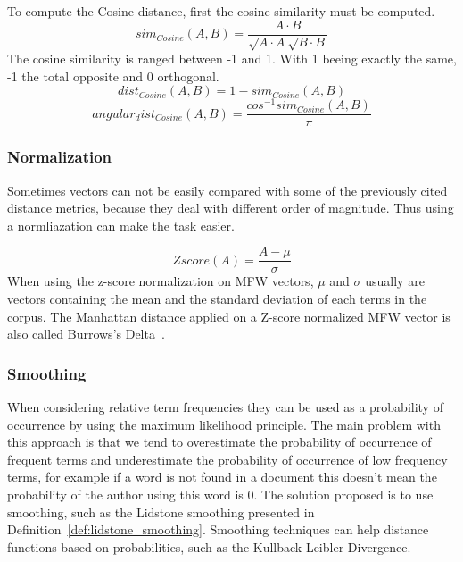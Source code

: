 \begin{definition}
  \label{def:cosine_dist}
  To compute the Cosine distance, first the cosine similarity must be computed.
  \begin{equation}
    sim_{Cosine}(A, B) = \frac{A \cdot B}{\sqrt{A \cdot A}\sqrt{B \cdot B}}
  \end{equation}
  The cosine similarity is ranged between -1 and 1.
  With 1 beeing exactly the same, -1 the total opposite and 0 orthogonal.
  \begin{equation}
    dist_{Cosine}(A, B) = 1 - sim_{Cosine}(A, B)
  \end{equation}
  \begin{equation}
    angular_dist_{Cosine}(A, B) = \frac{cos^{-1}sim_{Cosine}(A, B)}{\pi}
  \end{equation}
\end{definition}

\subsubsection{Normalization}

Sometimes vectors can not be easily compared with some of the previously cited distance metrics, because they deal with different order of magnitude.
Thus using a normliazation can make the task easier.

\begin{definition}
  \begin{equation}
    Zscore(A) = \frac{A - \mu}{\sigma}
  \end{equation}
  When using the z-score normalization on MFW vectors, $\mu$ and $\sigma$ usually are vectors containing the mean and the standard deviation of each terms in the corpus.
  The Manhattan distance applied on a Z-score normalized MFW vector is also called Burrows's Delta~\cite{savoy_stylo}.
\end{definition}

\subsubsection{Smoothing}

When considering relative term frequencies they can be used as a probability of occurrence by using the maximum likelihood principle.
The main problem with this approach is that we tend to overestimate the probability of occurrence of frequent terms and underestimate the probability of occurrence of low frequency terms, for example if a word is not found in a document this doesn't mean the probability of the author using this word is 0.
The solution proposed is to use smoothing, such as the Lidstone smoothing presented in Definition~\ref{def:lidstone_smoothing}.
Smoothing techniques can help distance functions based on probabilities, such as the Kullback-Leibler Divergence.

